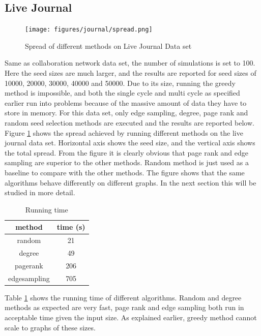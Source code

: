\documentclass[english]{tktltiki}
\begin{document}
\subsection{Live Journal}

\begin{figure}[ht!]
\centering
\texttt{[image: figures/journal/spread.png]}
\caption{Spread of different methods on Live Journal Data set}
\label{journal:spread}
\end{figure}

Same as collaboration network data set, the number of simulations is set to 100. Here the seed sizes are much larger, and the results are reported for seed sizes of 10000, 20000, 30000, 40000 and 50000. Due to its size, running the greedy method is impossible, and both the single cycle and multi cycle as specified earlier run into problems because of the massive amount of data they have to store in memory. For this data set, only edge sampling, degree, page rank and random seed selection methods are executed and the results are reported below.
Figure \ref{journal:spread} shows the spread achieved by running different methods on the live journal data set. Horizontal axis shows the seed size, and the vertical axis shows the total spread. From the figure it is clearly obvious that page rank and edge sampling are superior to the other methods. Random method is just used as a baseline to compare with the other methods. The figure shows that the same algorithms behave differently on different graphs. In the next section this will be studied in more detail.

\begin{table}[ht!]
\centering
\begin{tabular}{ |c|c| }
\hline 
  method & time (s)\\
  \hline 
  random & 21\\
  degree & 49\\
  pagerank&206\\
  edgesampling&705\\
  \hline 
\end{tabular}
\caption{Running time}
\label{journal:time}
\end{table}

Table \ref{journal:time} shows the running time of different algorithms. Random and degree methods as expected are very fast, page rank and edge sampling both run in acceptable time given the input size. As explained earlier, greedy method cannot scale to graphs of these sizes. 

\pagebreak
\pagebreak
\end{document}
